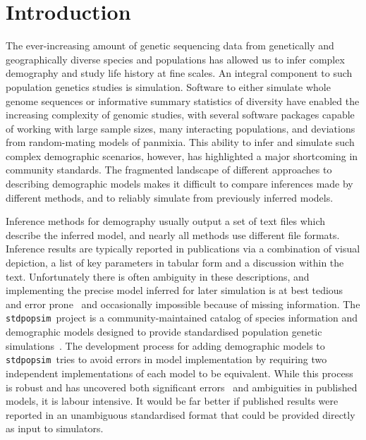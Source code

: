 \documentclass[11pt]{article}
\newcommand{\stdpopsim}[0]{\texttt{stdpopsim}}
\begin{document}
\section*{Introduction}

The ever-increasing amount of genetic sequencing data from genetically and
geographically diverse species and populations has allowed us to infer complex
demography and study life history at fine scales. An integral component to such
population genetics studies is simulation. Software to either simulate whole
genome sequences
\citep{thornton2014cpp,staab2015scrm,kelleher2016efficient,haller2019slim}
or informative summary statistics of diversity
\citep{gutenkunst2009inferring,kamm2017efficient,jouganous2017inferring} have
enabled the increasing complexity of genomic studies, with several software
packages capable of working with large sample sizes, many interacting populations, and
deviations from random-mating models of panmixia.
This ability to infer and simulate such complex demographic scenarios, however,
has highlighted a major shortcoming in community standards. The fragmented
landscape of different approaches to describing demographic models makes
it difficult to compare inferences made by different methods,
and to reliably simulate from previously inferred models.

Inference methods for demography usually output a set of
text files which describe the inferred model,
and nearly all methods use different file formats.
Inference results are typically reported in publications
via a combination of visual depiction,
a list of key parameters in tabular form and a discussion within the text.
Unfortunately there is often ambiguity in these descriptions, and
implementing the precise model inferred for later simulation
is at best tedious and error prone~\citep{ragsdale2020lessons}
and occasionally impossible because of missing information.
The \stdpopsim\ project is a community-maintained catalog of species
information and demographic models designed to provide standardised
population genetic simulations~\citep{adrion2020community}.
The development process for adding demographic models to
\stdpopsim\ tries to avoid errors in model implementation by requiring two
independent implementations of each model
to be equivalent. While this process is
robust and has uncovered both significant
errors~\citep{ragsdale2020lessons} and ambiguities in
published models, it is labour intensive.
It would be far better if published results
were reported in an unambiguous standardised format that could be provided
directly as input to simulators.
\end{document}
